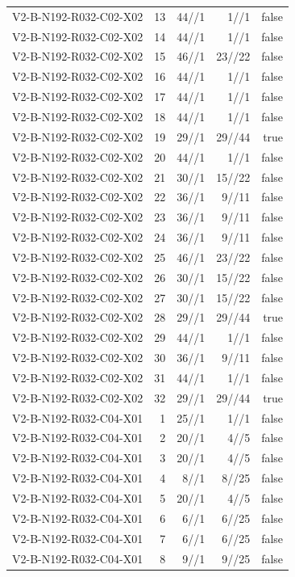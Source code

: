 {\begin{longtable}{lrrrr}
V2-B-N192-R032-C02-X02 & 13 & 44//1 & 1//1 & false \\
V2-B-N192-R032-C02-X02 & 14 & 44//1 & 1//1 & false \\
V2-B-N192-R032-C02-X02 & 15 & 46//1 & 23//22 & false \\
V2-B-N192-R032-C02-X02 & 16 & 44//1 & 1//1 & false \\
V2-B-N192-R032-C02-X02 & 17 & 44//1 & 1//1 & false \\
V2-B-N192-R032-C02-X02 & 18 & 44//1 & 1//1 & false \\
V2-B-N192-R032-C02-X02 & 19 & 29//1 & 29//44 & true \\
V2-B-N192-R032-C02-X02 & 20 & 44//1 & 1//1 & false \\
V2-B-N192-R032-C02-X02 & 21 & 30//1 & 15//22 & false \\
V2-B-N192-R032-C02-X02 & 22 & 36//1 & 9//11 & false \\
V2-B-N192-R032-C02-X02 & 23 & 36//1 & 9//11 & false \\
V2-B-N192-R032-C02-X02 & 24 & 36//1 & 9//11 & false \\
V2-B-N192-R032-C02-X02 & 25 & 46//1 & 23//22 & false \\
V2-B-N192-R032-C02-X02 & 26 & 30//1 & 15//22 & false \\
V2-B-N192-R032-C02-X02 & 27 & 30//1 & 15//22 & false \\
V2-B-N192-R032-C02-X02 & 28 & 29//1 & 29//44 & true \\
V2-B-N192-R032-C02-X02 & 29 & 44//1 & 1//1 & false \\
V2-B-N192-R032-C02-X02 & 30 & 36//1 & 9//11 & false \\
V2-B-N192-R032-C02-X02 & 31 & 44//1 & 1//1 & false \\
V2-B-N192-R032-C02-X02 & 32 & 29//1 & 29//44 & true \\
V2-B-N192-R032-C04-X01 & 1 & 25//1 & 1//1 & false \\
V2-B-N192-R032-C04-X01 & 2 & 20//1 & 4//5 & false \\
V2-B-N192-R032-C04-X01 & 3 & 20//1 & 4//5 & false \\
V2-B-N192-R032-C04-X01 & 4 & 8//1 & 8//25 & false \\
V2-B-N192-R032-C04-X01 & 5 & 20//1 & 4//5 & false \\
V2-B-N192-R032-C04-X01 & 6 & 6//1 & 6//25 & false \\
V2-B-N192-R032-C04-X01 & 7 & 6//1 & 6//25 & false \\
V2-B-N192-R032-C04-X01 & 8 & 9//1 & 9//25 & false \\

\end{longtable}}
